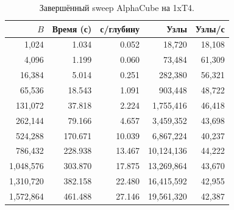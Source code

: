\documentclass[10pt,twocolumn]{article}
\begin{document}
\begin{table}[t]
\centering
\small
\caption{Завершённый sweep AlphaCube на 1xT4.}
\label{tab:alpha_curve}
\begin{tabular}{@{}rrrrr@{}}
\toprule
$B$ & Время (с) & с/глубину & Узлы & Узлы/с \\
\midrule
1,024 & 1.034 & 0.052 & 18,720 & 18,108 \\
4,096 & 1.199 & 0.060 & 73,484 & 61,309 \\
16,384 & 5.014 & 0.251 & 282,380 & 56,321 \\
65,536 & 18.543 & 1.091 & 903,448 & 48,722 \\
131,072 & 37.818 & 2.224 & 1,755,416 & 46,418 \\
262,144 & 79.166 & 4.657 & 3,459,352 & 43,698 \\
524,288 & 170.671 & 10.039 & 6,867,224 & 40,237 \\
786,432 & 228.938 & 13.467 & 10,124,136 & 44,222 \\
1,048,576 & 303.870 & 17.875 & 13,269,864 & 43,670 \\
1,310,720 & 382.158 & 22.480 & 16,415,592 & 42,955 \\
1,572,864 & 461.488 & 27.146 & 19,561,320 & 42,387 \\
\bottomrule
\end{tabular}
\end{table}
\end{document}
